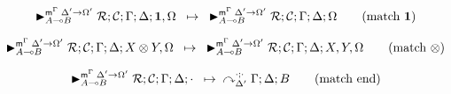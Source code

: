 
\begin{align}
\trans{\matstate{A \lolli B}{\rulestk}{\lstack{C}}{\Gamma}{\Delta}{\one,
   \Omega}{\Delta' \rightarrow \Omega'}}
{\matstate{A \lolli B}{\rulestk}{\lstack{C}}{\Gamma}{\Delta}{\Omega}{\Delta'
   \rightarrow \Omega'}} \tag{match $\one$}
\end{align}

\begin{align}
\trans{\matstate{A \lolli B}{\rulestk}{\lstack{C}}{\Gamma}{\Delta}{X \otimes Y,
   \Omega}{\Delta' \rightarrow \Omega'}}
{\matstate{A \lolli B}{\rulestk}{\lstack{C}}{\Gamma}{\Delta}{X, Y,
   \Omega}{\Delta' \rightarrow \Omega'}} \tag{match $\otimes$}
\end{align}

\begin{align}
\trans{\matstate{A \lolli
   B}{\rulestk}{\lstack{C}}{\Gamma}{\Delta}{\cdot}{\Delta' \rightarrow \Omega'}}
{
   \derstatex{\Gamma}{\Delta}{\Delta'}{\cdot}{\cdot}{B}
} \tag{match end}
\end{align}
